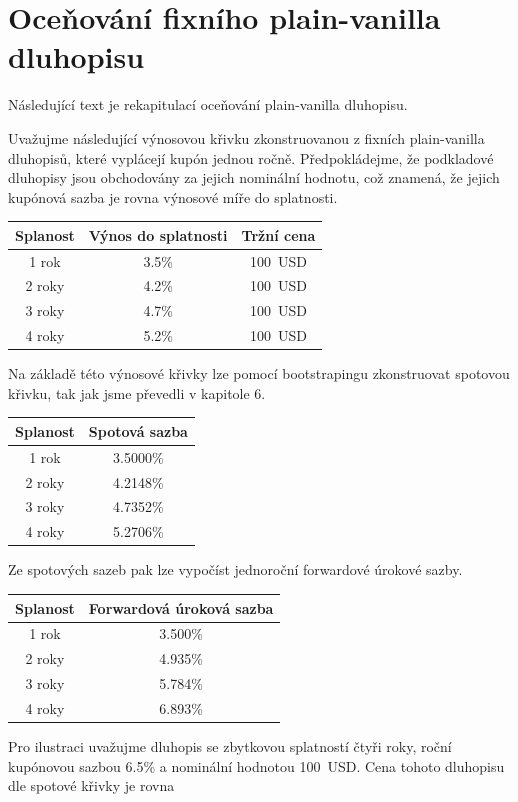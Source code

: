 \documentclass[a4paper]{book}
\begin{document}
\section{Oceňování fixního plain-vanilla dluhopisu}

Následující text je rekapitulací oceňování plain-vanilla dluhopisu.

Uvažujme následující výnosovou křivku zkonstruovanou z fixních plain-vanilla dluhopisů, které vyplácejí kupón jednou ročně. Předpokládejme, že podkladové dluhopisy jsou obchodovány za jejich nominální hodnotu, což znamená, že jejich kupónová sazba je rovna výnosové míře do splatnosti.
\begin{center}
\begin{tabular}{c c c}
\textbf{Splanost} & \textbf{Výnos do splatnosti} & \textbf{Tržní cena}\\
\hline
1 rok  & 3.5\% & 100~USD\\
2 roky & 4.2\% & 100~USD\\
3 roky & 4.7\% & 100~USD\\
4 roky & 5.2\% & 100~USD\\
\end{tabular}
\end{center}
Na základě této výnosové křivky lze pomocí bootstrapingu zkonstruovat spotovou křivku, tak jak jsme převedli v kapitole 6.
\begin{center}
\begin{tabular}{c c}
\textbf{Splanost} & \textbf{Spotová sazba}\\
\hline
1 rok  & 3.5000\% \\
2 roky & 4.2148\% \\
3 roky & 4.7352\% \\
4 roky & 5.2706\% \\
\end{tabular}
\end{center}
Ze spotových sazeb pak lze vypočíst jednoroční forwardové úrokové sazby.
\begin{center}
\begin{tabular}{c c}
\textbf{Splanost} & \textbf{Forwardová úroková sazba} \\
\hline
1 rok  & 3.500\% \\
2 roky & 4.935\% \\
3 roky & 5.784\% \\
4 roky & 6.893\% \\
\end{tabular}
\end{center}
Pro ilustraci uvažujme dluhopis se zbytkovou splatností čtyři roky, roční kupónovou sazbou 6.5\% a nominální hodnotou 100~USD. Cena tohoto dluhopisu dle spotové křivky je rovna
\end{document}
